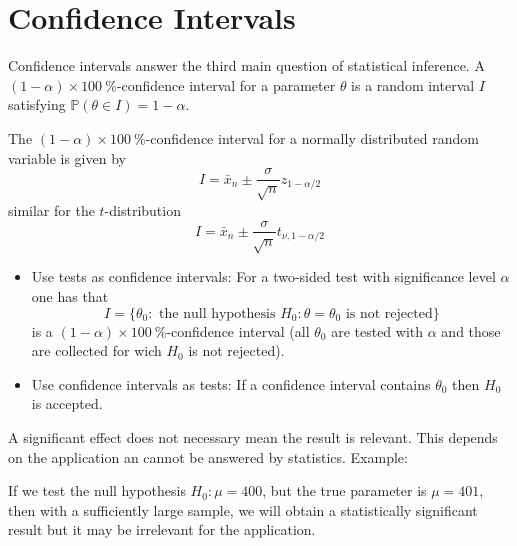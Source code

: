 \section{Confidence Intervals}
Confidence intervals answer the third main question of statistical inference.
A $(1-\alpha)\times 100\:\%$-confidence interval for a parameter $\theta$ is a random interval $I$ satisfying $\mathbb{P}(\theta\in I)=1-\alpha$.

The $(1-\alpha)\times 100\:\%$-confidence interval for a normally distributed random variable is given by
\begin{equation*}
    I=\bar{x}_n \pm \frac{\sigma}{\sqrt{n}}z_{1-\alpha/2}
\end{equation*}
similar for the $t$-distribution
\begin{equation*}
    I=\bar{x}_n \pm \frac{\sigma}{\sqrt{n}}t_{\nu,1-\alpha/2}
\end{equation*}

\newpar{}

\begin{itemize}
    \item Use tests as confidence intervals: For a two-sided test with significance level $\alpha$ one has that
    \begin{equation*}
        I=\{\theta_0:\text{ the null hypothesis }H_0\colon\theta=\theta_0\text{ is not rejected}\}
    \end{equation*}
    is a $(1-\alpha)\times 100\:\%$-confidence interval (all $\theta_0$ are tested with $\alpha$ and those are collected for wich $H_0$ is not rejected).
    \item Use confidence intervals as tests: If a confidence interval contains $\theta_0$ then $H_0$ is accepted.
\end{itemize}

\newpar{}

A significant effect does not necessary mean the result is relevant. This depends on the application an cannot be answered by statistics.
\newpar{}
Example:

If we test the null hypothesis $H_0:\mu=400$, but the true parameter is $\mu=401$, then with a sufficiently large sample, we will obtain a statistically significant result but it may be irrelevant for the application.
